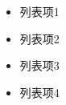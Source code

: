 \documentclass[UTF8]{ctexart}
\begin{document}
\begin{itemize}
    \item 列表项1
    \item 列表项2
    \item 列表项3
    \item 列表项4
\end{itemize}
\end{document}
